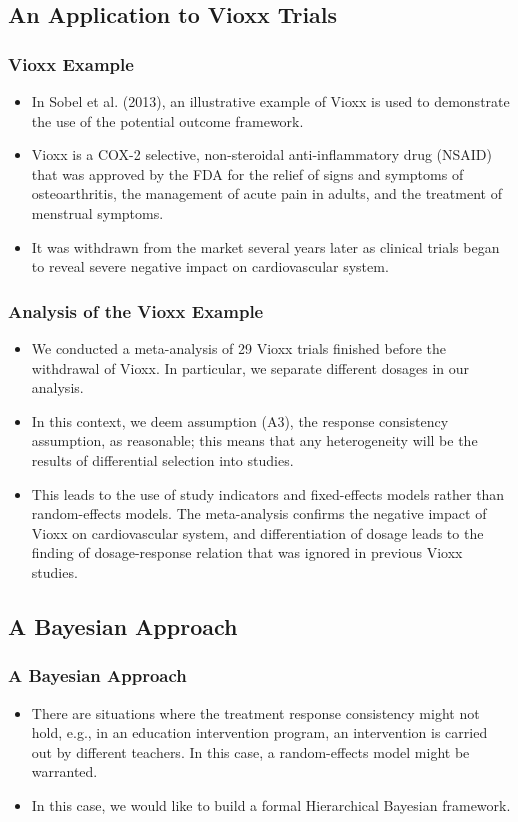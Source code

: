 \documentclass[xetex,mathserif,serif]{beamer}
\begin{document}
\subsection{An Application to Vioxx Trials}
\begin{frame}
  \frametitle{Vioxx Example}
  \begin{itemize}
  \item In Sobel et al. (2013), an illustrative example of Vioxx is used to
    demonstrate the use of the potential outcome framework.
  \item Vioxx is a COX-2 selective, non-steroidal anti-inflammatory drug (NSAID)
    that was approved by the FDA for the relief of signs and symptoms of
    osteoarthritis, the management of acute pain in adults, and the treatment of
    menstrual symptoms.
  \item It was withdrawn from the market several years later as clinical trials
    began to reveal severe negative impact on cardiovascular system.
  \end{itemize}
\end{frame}

\begin{frame}
  \frametitle{Analysis of the Vioxx Example}
  \begin{itemize}
  \item We conducted a meta-analysis of 29 Vioxx trials finished before the
    withdrawal of Vioxx. In particular, we separate different dosages in our
    analysis.  \pause
  \item In this context, we deem assumption (A3), the response consistency
    assumption, as reasonable; this means that any heterogeneity will be the
    results of differential selection into studies.  
    \pause
  \item This leads to the use of study indicators and fixed-effects models rather
    than random-effects models. The meta-analysis confirms the negative impact of
    Vioxx on cardiovascular system, and differentiation of dosage leads to the
    finding of dosage-response relation that was ignored in previous Vioxx
    studies.
  \end{itemize}
\end{frame}
\subsection{A Bayesian Approach}
\begin{frame}
  \frametitle{A Bayesian Approach}
  \begin{itemize}
  \item There are situations where the treatment response consistency might not
    hold, e.g., in an education intervention program, an intervention is carried
    out by different teachers. In this case, a random-effects model might be
    warranted.
    \pause
  \item In this case, we would like to build a formal Hierarchical Bayesian
    framework.
  \end{itemize}
\end{frame}
\end{document}
